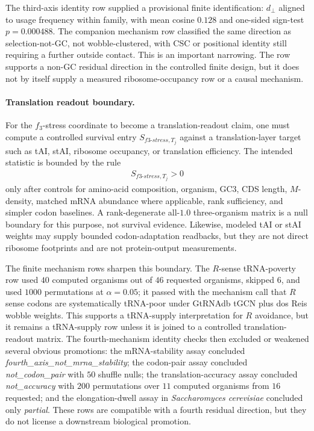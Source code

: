 The third-axis identity row supplied a provisional finite identification: $d_\perp$ aligned to usage frequency within family, with mean cosine $0.128$ and one-sided sign-test $p=0.000488$.  The companion mechanism row classified the same direction as selection-not-GC, not wobble-clustered, with CSC or positional identity still requiring a further outside contact.  This is an important narrowing.  The row supports a non-GC residual direction in the controlled finite design, but it does not by itself supply a measured ribosome-occupancy row or a causal mechanism.

\paragraph{Translation readout boundary.}
For the $f_3$-stress coordinate to become a translation-readout claim, one must compute a controlled survival entry $S_{f3\text{-}stress,T_j}$ against a translation-layer target such as tAI, stAI, ribosome occupancy, or translation efficiency.  The intended statistic is bounded by the rule
$$
\begin{aligned}
S_{f3\text{-}stress,T_j}>0
\end{aligned}
$$
only after controls for amino-acid composition, organism, GC3, CDS length, $M$-density, matched mRNA abundance where applicable, rank sufficiency, and simpler codon baselines.  A rank-degenerate all-$1.0$ three-organism matrix is a null boundary for this purpose, not survival evidence.  Likewise, modeled tAI or stAI weights may supply bounded codon-adaptation readbacks, but they are not direct ribosome footprints and are not protein-output measurements.

The finite mechanism rows sharpen this boundary.  The $R$-sense tRNA-poverty row used $40$ computed organisms out of $46$ requested organisms, skipped $6$, and used $1000$ permutations at $\alpha=0.05$; it passed with the mechanism call that $R$ sense codons are systematically tRNA-poor under GtRNAdb tGCN plus dos Reis wobble weights.  This supports a tRNA-supply interpretation for $R$ avoidance, but it remains a tRNA-supply row unless it is joined to a controlled translation-readout matrix.  The fourth-mechanism identity checks then excluded or weakened several obvious promotions: the mRNA-stability assay concluded \emph{fourth\_axis\_not\_mrna\_stability}; the codon-pair assay concluded \emph{not\_codon\_pair} with $50$ shuffle nulls; the translation-accuracy assay concluded \emph{not\_accuracy} with $200$ permutations over $11$ computed organisms from $16$ requested; and the elongation-dwell assay in \emph{Saccharomyces cerevisiae} concluded only \emph{partial}.  These rows are compatible with a fourth residual direction, but they do not license a downstream biological promotion.

